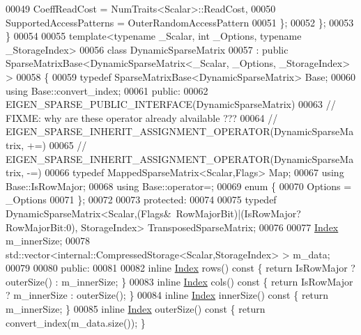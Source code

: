 \begin{DoxyCode}
00049     CoeffReadCost = NumTraits<Scalar>::ReadCost,
00050     SupportedAccessPatterns = OuterRandomAccessPattern
00051   \};
00052 \};
00053 \}
00054 
00055 \textcolor{keyword}{template}<\textcolor{keyword}{typename} \_Scalar, \textcolor{keywordtype}{int} \_Options, \textcolor{keyword}{typename} \_StorageIndex>
00056  \textcolor{keyword}{class  }DynamicSparseMatrix
00057   : \textcolor{keyword}{public} SparseMatrixBase<DynamicSparseMatrix<\_Scalar, \_Options, \_StorageIndex> >
00058 \{
00059     \textcolor{keyword}{typedef} SparseMatrixBase<DynamicSparseMatrix> Base;
00060     \textcolor{keyword}{using} Base::convert\_index;
00061   \textcolor{keyword}{public}:
00062     EIGEN\_SPARSE\_PUBLIC\_INTERFACE(DynamicSparseMatrix)
00063     \textcolor{comment}{// FIXME: why are these operator already alvailable ???}
00064     \textcolor{comment}{// EIGEN\_SPARSE\_INHERIT\_ASSIGNMENT\_OPERATOR(DynamicSparseMatrix, +=)}
00065     \textcolor{comment}{// EIGEN\_SPARSE\_INHERIT\_ASSIGNMENT\_OPERATOR(DynamicSparseMatrix, -=)}
00066     \textcolor{keyword}{typedef} MappedSparseMatrix<Scalar,Flags> Map;
00067     \textcolor{keyword}{using} Base::IsRowMajor;
00068     \textcolor{keyword}{using} Base::operator=;
00069     \textcolor{keyword}{enum} \{
00070       Options = \_Options
00071     \};
00072 
00073   \textcolor{keyword}{protected}:
00074 
00075     \textcolor{keyword}{typedef} DynamicSparseMatrix<Scalar,(Flags&~RowMajorBit)|(IsRowMajor?RowMajorBit:0), StorageIndex> 
      TransposedSparseMatrix;
00076 
00077     \hyperlink{namespace_eigen_a62e77e0933482dafde8fe197d9a2cfde}{Index} m\_innerSize;
00078     std::vector<internal::CompressedStorage<Scalar,StorageIndex> > m\_data;
00079 
00080   \textcolor{keyword}{public}:
00081 
00082     \textcolor{keyword}{inline} \hyperlink{namespace_eigen_a62e77e0933482dafde8fe197d9a2cfde}{Index} rows()\textcolor{keyword}{ const }\{ \textcolor{keywordflow}{return} IsRowMajor ? outerSize() : m\_innerSize; \}
00083     \textcolor{keyword}{inline} \hyperlink{namespace_eigen_a62e77e0933482dafde8fe197d9a2cfde}{Index} cols()\textcolor{keyword}{ const }\{ \textcolor{keywordflow}{return} IsRowMajor ? m\_innerSize : outerSize(); \}
00084     \textcolor{keyword}{inline} \hyperlink{namespace_eigen_a62e77e0933482dafde8fe197d9a2cfde}{Index} innerSize()\textcolor{keyword}{ const }\{ \textcolor{keywordflow}{return} m\_innerSize; \}
00085     \textcolor{keyword}{inline} \hyperlink{namespace_eigen_a62e77e0933482dafde8fe197d9a2cfde}{Index} outerSize()\textcolor{keyword}{ const }\{ \textcolor{keywordflow}{return} convert\_index(m\_data.size()); \}

\end{DoxyCode}
